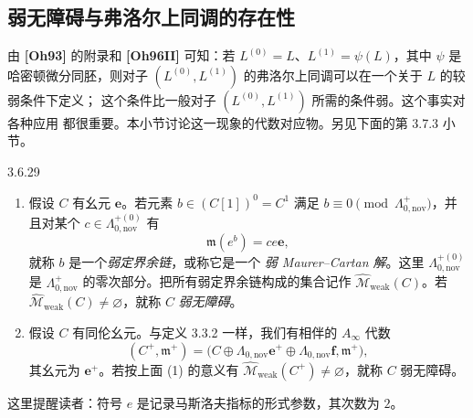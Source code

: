 
\subsection{弱无障碍与弗洛尔上同调的存在性}
\label{subsec:3-6-3}

由 \textbf{[Oh93]} 的附录和 \textbf{[Oh96II]} 可知：若
$L^{(0)}=L$、$L^{(1)}=\psi(L)$，其中 $\psi$ 是哈密顿微分同胚，则对子
$(L^{(0)},L^{(1)})$ 的弗洛尔上同调可以在一个关于 $L$ 的较弱条件下定义；
这个条件比一般对子 $(L^{(0)},L^{(1)})$ 所需的条件弱。这个事实对各种应用
都很重要。本小节讨论这一现象的代数对应物。另见下面的第 3.7.3 小节。

\begin{definition}{3.6.29}\label{def:3-6-29}
\begin{enumerate}[label=\textup{(\arabic*)},leftmargin=2.8em]
  \item 假设 $C$ 有幺元 $\mathbf e$。若元素
  $b\in(C[1])^0=C^1$ 满足
  $b\equiv0\pmod{\Lambda^+_{0,\mathrm{nov}}}$，并且对某个
  $c\in\Lambda_{0,\mathrm{nov}}^{+(0)}$ 有
  \begin{equation}
    \mathfrak m(e^b)=ce\mathbf e,
    \tag{3.6.30}\label{eq:3-6-30}
  \end{equation}
  就称 $b$ 是一个\emph{弱定界余链}，或称它是一个
  \emph{弱 Maurer--Cartan 解}。这里
  $\Lambda_{0,\mathrm{nov}}^{+(0)}$ 是
  $\Lambda^+_{0,\mathrm{nov}}$ 的零次部分。把所有弱定界余链构成的集合记作
  $\widehat{\mathcal M}_{\mathrm{weak}}(C)$。若
  $\widehat{\mathcal M}_{\mathrm{weak}}(C)\ne\varnothing$，就称 $C$
  \emph{弱无障碍}。

  \item 假设 $C$ 有同伦幺元。与定义 3.3.2 一样，我们有相伴的
  $A_\infty$ 代数
  \[
    (C^+,\mathfrak m^+)
    =\bigl(C\oplus\Lambda_{0,\mathrm{nov}}\mathbf e^+
      \oplus\Lambda_{0,\mathrm{nov}}\mathbf f,\mathfrak m^+\bigr),
  \]
  其幺元为 $\mathbf e^+$。若按上面 (1) 的意义有
  $\widehat{\mathcal M}_{\mathrm{weak}}(C^+)\ne\varnothing$，就称 $C$
  弱无障碍。
\end{enumerate}
这里提醒读者：符号 $e$ 是记录马斯洛夫指标的形式参数，其次数为 $2$。
\end{definition}

